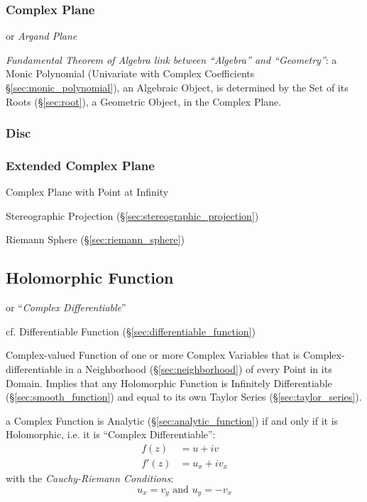 \subsubsection{Complex Plane}\label{sec:complex_plane}

or \emph{Argand Plane}

\emph{Fundamental Theorem of Algebra link between ``Algebra'' and
  ``Geometry''}: a Monic Polynomial (Univariate with Complex Coefficients
\S\ref{sec:monic_polynomial}), an Algebraic Object, is determined by the Set of
its Roots (\S\ref{sec:root}), a Geometric Object, in the Complex
Plane.



\subsubsection{Disc}\label{sec:disc}

\subsubsection{Extended Complex Plane}\label{sec:extended_complex_plane}

Complex Plane with Point at Infinity

Stereographic Projection (\S\ref{sec:stereographic_projection})

Riemann Sphere (\S\ref{sec:riemann_sphere})



\subsection{Holomorphic Function}\label{sec:holomorphic_function}

or ``\emph{Complex Differentiable}''

cf. Differentiable Function (\S\ref{sec:differentiable_function})

Complex-valued Function of one or more Complex Variables that is
Complex-differentiable in a Neighborhood (\S\ref{sec:neighborhood}) of
every Point in its Domain. Implies that any Holomorphic Function is
Infinitely Differentiable (\S\ref{sec:smooth_function}) and equal to
its own Taylor Series (\S\ref{sec:taylor_series}).

a Complex Function is Analytic (\S\ref{sec:analytic_function}) if and only if
it is Holomorphic, i.e. it is ``Complex Differentiable'':
\begin{align*}
  f(z)  & = u + iv \\
  f'(z) & = u_x + iv_x
\end{align*}
with the \emph{Cauchy-Riemann Conditions}:
\[
  u_x = v_y \text{ and } u_y = - v_x
\]

